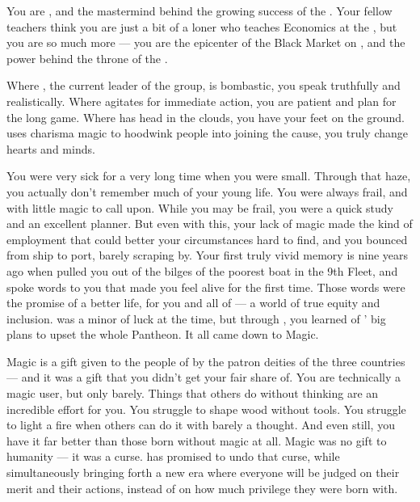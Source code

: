 \documentclass[char]{GL2020}
\begin{document}
\name{\cChupSecond{}}

You are \cChupSecond{\intro}, and the mastermind behind the growing success of the \pGoaties{}. Your fellow teachers think you are just a bit of a loner who teaches Economics at the \pSchool{}, but you are so much more — you are the epicenter of the Black Market on \pEarth{}, and the power behind the throne of the \pGoaties{}.

Where \cChupLeader{\intro}, the current leader of the group, is bombastic, you speak truthfully and realistically. Where \cChupLeader{} agitates for immediate action, you are patient and plan for the long game. Where \cChupLeader{} has \cChupLeader{\their} head in the clouds, you have your feet on the ground. \cChupLeader{} uses charisma magic to hoodwink people into joining the cause, you truly change hearts and minds.

You were very sick for a very long time when you were small. Through that haze, you actually don't remember much of your young life. You were always frail, and with little magic to call upon. While you may be frail, you were a quick study and an excellent planner. But even with this, your lack of magic made the kind of employment that could better your circumstances hard to find, and you bounced from ship to port, barely scraping by. Your first truly vivid memory is nine years ago when \cChupLeader{} pulled you out of the bilges of the poorest boat in the 9th Fleet, and spoke words to you that made you feel alive for the first time. Those words were the promise of a better life, for you and all of \pEarth{} — a world of true equity and inclusion. \cGenesis{\intro} was a minor \cGenesis{\Deity} of luck at the time, but through \cChupLeader{}, you learned of \cGenesis{}' big plans to upset the whole Pantheon. It all came down to Magic.

Magic is a gift given to the people of \pEarth{} by the patron deities of the three countries — and it was a gift that you didn't get your fair share of. You are technically a magic user, but only barely. Things that others do without thinking are an incredible effort for you. You struggle to shape wood without tools. You struggle to light a fire when others can do it with barely a thought. And even still, you have it far better than those born without magic at all. Magic was no gift to humanity — it was a curse. \cGenesis{} has promised to undo that curse, while simultaneously bringing forth a new era where everyone will be judged on their merit and their actions, instead of on how much privilege they were born with.
\end{document}
